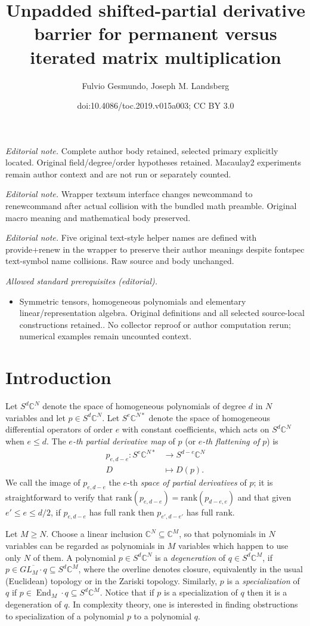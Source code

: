 \documentclass[11pt]{article}
\title{Unpadded shifted-partial derivative barrier for permanent versus iterated matrix multiplication}
\author{Fulvio Gesmundo, Joseph M. Landsberg}
\date{doi:10.4086/toc.2019.v015a003; CC BY 3.0}
\numberwithin{equation}{section}
\theoremstyle{definition}
\theoremstyle{plain}
\newcommand{\bbC}{\mathbb{C}}
\DeclareMathOperator{\End}{End}
\def\BC{\mathbb C}
\def\trank{\mathrm{rank}}
\begin{document}
\maketitle
\noindent\textit{Editorial note.} Complete author body retained, selected primary explicitly located. Original field/degree/order hypotheses retained. Macaulay2 experiments remain author context and are not run or separately counted.\par\medskip
\noindent\textit{Editorial note.} Wrapper textsum interface changes newcommand to renewcommand after actual collision with the bundled math preamble. Original macro meaning and mathematical body preserved.\par\medskip
\noindent\textit{Editorial note.} Five original text-style helper names are defined with provide+renew in the wrapper to preserve their author meanings despite fontspec text-symbol name collisions. Raw source and body unchanged.\par\medskip
\noindent\textit{Allowed standard prerequisites (editorial).}\begin{itemize}
\item Symmetric tensors, homogeneous polynomials and elementary linear/representation algebra. Original definitions and all selected source-local constructions retained.. No collector reproof or author computation rerun; numerical examples remain uncounted context.
\end{itemize}\medskip
\section{Introduction} 
 Let $S^d\BC^N$ denote the space of homogeneous polynomials of degree $d$ in $N$ variables and let $p\in S^d\BC^N$. Let $S^e\BC^{N*}$ denote the space of homogeneous differential operators of order $e$ with constant coefficients, which acts on $S^d\BC^N$ when $e\leq d$. The \emph{$e$-th partial derivative map}  of $p$  (or \emph{$e$-th flattening of $p$}) is
\begin{align} \label{flateqn}
p_{e,d-e}: S^e\BC^{N*}& \to S^{d-e}\BC^N\\
\nonumber D & \mapsto D(p).
\end{align}
 We call the image of $p_{e,d-e}$ the $e$-th \emph{space of partial derivatives} of $p$; it is straightforward to verify that $\trank (p_{e,d-e}) = \trank (p_{d-e,e})$ and that given $e' \leq e \leq d/2$, if $p_{e,d-e}$ has full rank then $p_{e',d-e'}$ has full rank.

Let $M\geq N$. Choose a linear inclusion $\bbC^N \subseteq \bbC^M$, so that polynomials in $N$ variables can be regarded as polynomials in $M$ variables which happen to use only $N$ of them. A polynomial $p\in S^d\BC^N$ is a \emph{degeneration} of $q\in S^d\BC^M$, if  $p\in \overline{GL_M\cdot q}\subseteq S^d\BC^M$, where the overline denotes closure, equivalently in the usual (Euclidean) topology or in the Zariski topology.  Similarly, $p$ is a \emph{specialization} of $q$ if $p \in \End_{M} \cdot q \subseteq S^d \bbC^M$. Notice that if $p$ is a specialization of $q$ then it is a degeneration of $q$. In complexity theory, one is interested in finding obstructions to specialization of a polynomial $p$ to a polynomial $q$.  
\end{document}
